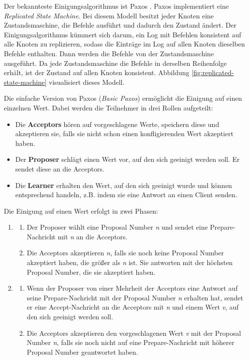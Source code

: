 Der bekannteste Einigungsalgorithmus ist Paxos \cite{paxos, paxos-made-simple}. Paxos implementiert eine \textit{Replicated State Machine}. Bei diesem Modell besitzt jeder Knoten eine Zustandsmaschine, die Befehle ausführt und dadurch den Zustand ändert. Der Einigungsalgorithmus kümmert sich darum, ein Log mit Befehlen konsistent auf alle Knoten zu replizieren, sodass die Einträge im Log auf allen Knoten dieselben Befehle enthalten. Dann werden die Befehle von der Zustandsmaschine ausgeführt. Da jede Zustandsmaschine die Befehle in derselben Reihenfolge erhält, ist der Zustand auf allen Knoten konsistent. Abbildung \ref{fig:replicated-state-machine} visualisiert dieses Modell.

Die einfache Version von Paxos (\textit{Basic Paxos}) ermöglicht die Einigung auf einen einzelnen Wert. Dabei werden die Teilnehmer in drei Rollen aufgeteilt:
\begin{itemize}
	\item Die \textbf{Acceptors} hören auf vorgeschlagene Werte, speichern diese und akzeptieren sie, falls sie nicht schon einen konfligierenden Wert akzeptiert haben.
	\item Der \textbf{Proposer} schlägt einen Wert vor, auf den sich geeinigt werden soll. Er sendet diese an die Acceptors.
	\item Die \textbf{Learner} erhalten den Wert, auf den sich geeinigt wurde und können entsprechend handeln, z.B. indem sie eine Antwort an einen Client senden.
\end{itemize}

Die Einigung auf einen Wert erfolgt in zwei Phasen:

\begin{enumerate}
	\item 
		\begin{enumerate}[label=\alph*)]
			\item Der Proposer wählt eine Proposal Number \textit{n} und sendet eine Prepare-Nachricht mit  \textit{n} an die Acceptors. 
			\item Die Acceptors akzeptieren \textit{n}, falls sie noch keine Proposal Number akzeptiert haben, die größer als \textit{n} ist. Sie antworten mit der höchsten Proposal Number, die sie akzeptiert haben.
		\end{enumerate}
	\item
		\begin{enumerate}[label=\alph*)]
		\item Wenn der Proposer von einer Mehrheit der Acceptors eine Antwort auf seine Prepare-Nachricht mit der Proposal Number \textit{n} erhalten hat, sendet er eine Accept-Nachricht an die Acceptors mit \textit{n} und einem Wert \textit{v}, auf den sich geeinigt werden soll.
		\item Die Acceptors akzeptieren den vorgeschlagenen Wert \textit{v} mit der Proposal Number \textit{n}, falls sie noch nicht auf eine Prepare-Nachricht mit höherer Proposal Number geantwortet haben.
	\end{enumerate}
\end{enumerate}

